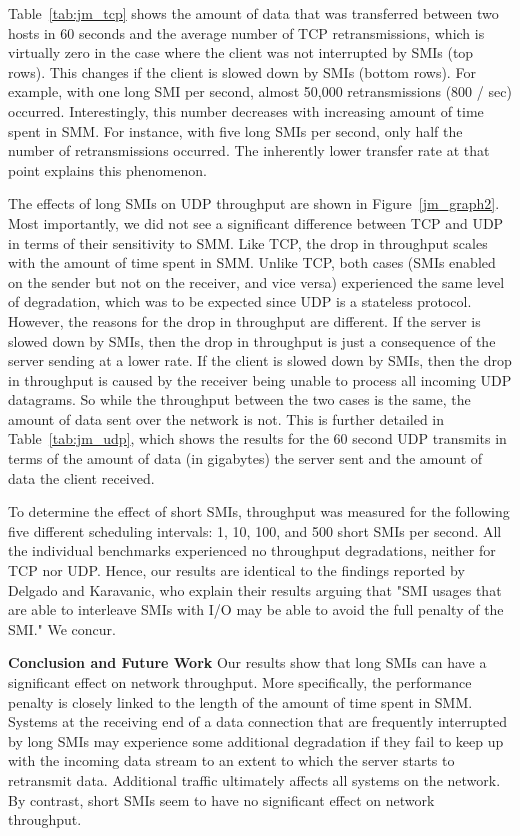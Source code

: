 \documentclass{IEEEtran}
\begin{document}
   Table~\ref{tab:jm_tcp} shows the amount of data that was transferred between two
   hosts in 60 seconds and the average number of TCP retransmissions, which is virtually
   zero in the case where the client was not interrupted by SMIs (top rows).
   This changes if the client is slowed down by SMIs (bottom rows).
   For example, with one long SMI per second, almost 50,000 retransmissions
   (800 / sec) occurred. Interestingly, this number decreases with increasing
   amount of time spent in SMM. For instance, with five long SMIs per second,
   only half the number of retransmissions occurred. The inherently lower
   transfer rate at that point explains this phenomenon.

   The effects of long SMIs on UDP throughput are shown in Figure~\ref{jm_graph2}.
   Most importantly, we did not see a significant difference between
   TCP and UDP in terms of their sensitivity to SMM.
   Like TCP, the drop in throughput scales with the amount of time spent
   in SMM.  
   Unlike TCP, both cases (SMIs enabled on the sender but not on the receiver,
   and vice versa) experienced the same level
   of degradation, which was to be expected since UDP is a stateless protocol.
   However, the reasons for the drop in throughput are different. If the server
   is slowed down by SMIs, then the drop in throughput is just a consequence
   of the server sending at a lower rate.  If the client is slowed down by SMIs,
   then the drop in throughput is caused by the receiver being unable to process
   all incoming UDP datagrams. So while the throughput between the two cases
   is the same, the amount of data sent over the network is not. This is
   further detailed in Table~\ref{tab:jm_udp}, which shows the results
   for the 60 second UDP transmits in terms of the amount of
   data (in gigabytes) the server sent and the amount of data the client received.

   To determine the effect of short SMIs, throughput was measured for the
   following five different scheduling intervals:  1, 10, 100, and 500 short
   SMIs per second. All the individual benchmarks experienced no throughput
   degradations, neither for TCP nor UDP. Hence, our results are identical
   to the findings reported by Delgado and Karavanic, who explain their results
   arguing that "SMI usages that are able to interleave SMIs with I/O may
   be able to avoid the full penalty of the SMI." \cite{KD} We concur.

   \textbf{Conclusion and Future Work}
   Our results show that long SMIs can have a significant effect on network
   throughput. More specifically, the performance penalty is closely linked
   to the length of the amount of time spent in SMM.
   Systems at the receiving end of a data connection that are frequently
   interrupted by long SMIs may experience some additional degradation
   if they fail to keep up with the incoming data stream to an extent to which
   the server starts to retransmit data.
   Additional traffic ultimately affects all systems on the network.
   By contrast, short SMIs seem to have no significant effect on network throughput.
   
\end{document}
